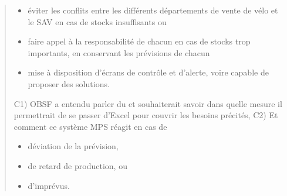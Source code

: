 \documentclass[letterpaper,10pt,french]{sphinxmanual}
\begin{document}
\begin{quote}
\begin{itemize}
\item {} 
éviter les conflits entre les différents départements de vente de vélo et le SAV en cas de stocks insuffisants ou

\item {} 
faire appel à la responsabilité de chacun en cas de stocks trop importants, en conservant les prévisions de chacun

\item {} 
mise à disposition d’écrans de contrôle et d’alerte, voire capable de proposer des solutions.

\end{itemize}

C1) OBSF a entendu parler du  et souhaiterait savoir dans quelle mesure il permettrait de se passer d’Excel pour couvrir les besoins précités,
C2) Et comment ce système MPS réagit en cas de
\begin{itemize}
\item {} 
déviation de la prévision,

\item {} 
de retard de production, ou

\item {} 
d’imprévus.

\end{itemize}
\end{quote}
\end{document}
